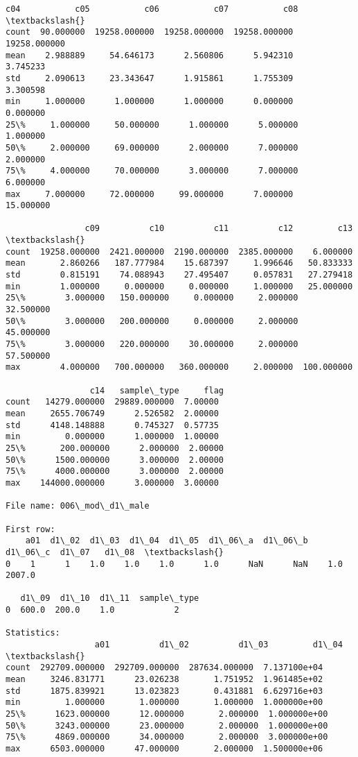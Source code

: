 \documentclass[11pt]{article}
\begin{document}
\begin{Verbatim}[commandchars=\\\{\}]
             c04           c05           c06           c07           c08  \textbackslash{}
count  90.000000  19258.000000  19258.000000  19258.000000  19258.000000   
mean    2.988889     54.646173      2.560806      5.942310      3.745233   
std     2.090613     23.343647      1.915861      1.755309      3.300598   
min     1.000000      1.000000      1.000000      0.000000      0.000000   
25\%     1.000000     50.000000      1.000000      5.000000      1.000000   
50\%     2.000000     69.000000      2.000000      7.000000      2.000000   
75\%     4.000000     70.000000      3.000000      7.000000      6.000000   
max     7.000000     72.000000     99.000000      7.000000     15.000000   

                c09          c10          c11          c12         c13  \textbackslash{}
count  19258.000000  2421.000000  2190.000000  2385.000000    6.000000   
mean       2.860266   187.777984    15.687397     1.996646   50.833333   
std        0.815191    74.088943    27.495407     0.057831   27.279418   
min        1.000000     0.000000     0.000000     1.000000   25.000000   
25\%        3.000000   150.000000     0.000000     2.000000   32.500000   
50\%        3.000000   200.000000     0.000000     2.000000   45.000000   
75\%        3.000000   220.000000    30.000000     2.000000   57.500000   
max        4.000000   700.000000   360.000000     2.000000  100.000000   

                 c14   sample\_type     flag  
count   14279.000000  29889.000000  7.00000  
mean     2655.706749      2.526582  2.00000  
std      4148.148888      0.745327  0.57735  
min         0.000000      1.000000  1.00000  
25\%       200.000000      2.000000  2.00000  
50\%      1500.000000      3.000000  2.00000  
75\%      4000.000000      3.000000  2.00000  
max    144000.000000      3.000000  3.00000  

File name: 006\_mod\_d1\_male

First row: 
    a01  d1\_02  d1\_03  d1\_04  d1\_05  d1\_06\_a  d1\_06\_b  d1\_06\_c  d1\_07   d1\_08  \textbackslash{}
0    1      1    1.0    1.0    1.0      1.0      NaN      NaN    1.0  2007.0   

   d1\_09  d1\_10  d1\_11  sample\_type  
0  600.0  200.0    1.0            2  

Statistics: 
                  a01          d1\_02          d1\_03         d1\_04  \textbackslash{}
count  292709.000000  292709.000000  287634.000000  7.137100e+04   
mean     3246.831771      23.026238       1.751952  1.961485e+02   
std      1875.839921      13.023823       0.431881  6.629716e+03   
min         1.000000       1.000000       1.000000  1.000000e+00   
25\%      1623.000000      12.000000       2.000000  1.000000e+00   
50\%      3243.000000      23.000000       2.000000  1.000000e+00   
75\%      4869.000000      34.000000       2.000000  3.000000e+00   
max      6503.000000      47.000000       2.000000  1.500000e+06   


\end{Verbatim}
\end{document}
